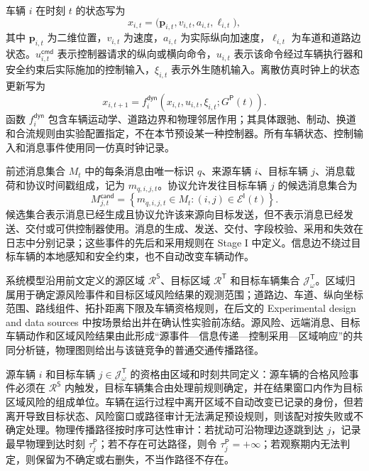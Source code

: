 \documentclass[10pt,a4paper,twocolumn]{article}
\begin{document}
车辆 $i$ 在时刻 $t$ 的状态写为
\begin{equation}
x_{i,t}=\bigl(\mathbf p_{i,t},v_{i,t},a_{i,t},\ell_{i,t}\bigr),
\end{equation}
其中 $\mathbf p_{i,t}$ 为二维位置，$v_{i,t}$ 为速度，$a_{i,t}$ 为实际纵向加速度，$\ell_{i,t}$ 为车道和道路边状态。$u_{i,t}^{\mathsf{cmd}}$ 表示控制器请求的纵向或横向命令，$u_{i,t}$ 表示该命令经过车辆执行器和安全约束后实际施加的控制输入，$\xi_{i,t}$ 表示外生随机输入。离散仿真时钟上的状态更新写为
\begin{equation}
x_{i,t+1}=f_i^{\mathsf{dyn}}\!\left(x_{i,t},u_{i,t},\xi_{i,t};G^{\mathsf P}(t)\right).
\end{equation}
函数 $f_i^{\mathsf{dyn}}$ 包含车辆运动学、道路边界和物理邻居作用；其具体跟驰、制动、换道和合流规则由实验配置指定，不在本节预设某一种控制器。所有车辆状态、控制输入和消息事件使用同一仿真时钟记录。

前述消息集合 $M_t$ 中的每条消息由唯一标识 $q$、来源车辆 $i$、目标车辆 $j$、消息载荷和协议时间戳组成，记为 $m_{q,i,j,t}$。协议允许发往目标车辆 $j$ 的候选消息集合为
\begin{equation}
M_{j,t}^{\mathsf{cand}}=\left\{m_{q,i,j,t}\in M_t:
(i,j)\in\mathcal{E}^{\mathsf I}(t)\right\}.
\end{equation}
候选集合表示消息已经生成且协议允许该来源向目标发送，但不表示消息已经发送、交付或可供控制器使用。消息的生成、发送、交付、字段校验、采用和失效在日志中分别记录；这些事件的先后和采用规则在 Stage I 中定义。信息边不绕过目标车辆的本地感知和安全约束，也不自动改变车辆动作。

系统模型沿用前文定义的源区域 $\mathcal R^{\mathsf S}$、目标区域 $\mathcal R^{\mathsf T}$ 和目标车辆集合 $\mathcal J^{\mathsf T}_{\omega}$。区域归属用于确定源风险事件和目标区域风险结果的观测范围；道路边、车道、纵向坐标范围、路线组件、拓扑距离下限及车辆资格规则，在后文的 Experimental design and data sources 中按场景给出并在确认性实验前冻结。源风险、远端消息、目标车辆动作和区域风险结果由此形成“源事件—信息传递—控制采用—区域响应”的共同分析链，物理图则给出与该链竞争的普通交通传播路径。

源车辆 $i$ 和目标车辆 $j\in\mathcal J^{\mathsf T}_{\omega}$ 的资格由区域和时刻共同定义：源车辆的合格风险事件必须在 $\mathcal R^{\mathsf S}$ 内触发，目标车辆集合由处理前规则确定，并在结果窗口内作为目标区域风险的组成单位。车辆在运行过程中离开区域不自动改变已记录的身份，但若离开导致目标状态、风险窗口或路径审计无法满足预设规则，则该配对按失败或不确定处理。物理传播路径按时序可达性审计：若扰动可沿物理边逐跳到达 $j$，记录最早物理到达时刻 $\tau_j^{\mathsf P}$；若不存在可达路径，则令 $\tau_j^{\mathsf P}=+\infty$；若观察期内无法判定，则保留为不确定或右删失，不当作路径不存在。
\end{document}
